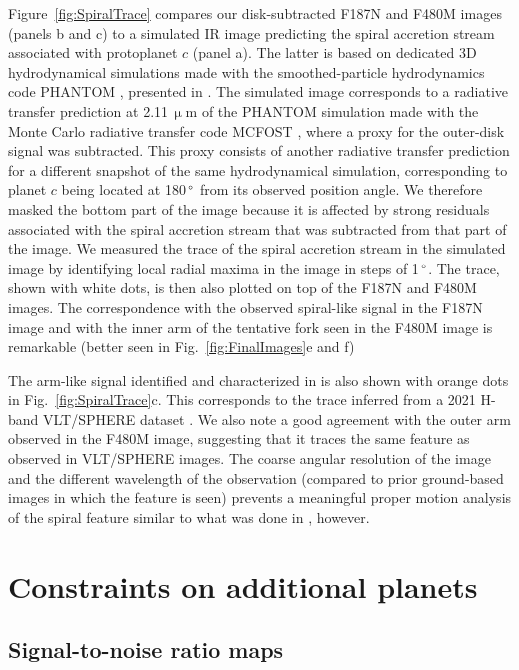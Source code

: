 \documentclass[longauth]{aa}
\begin{document}
\begin{appendix}
Figure~\ref{fig:SpiralTrace} compares our disk-subtracted F187N and F480M images (panels b and c) to a simulated IR image predicting the spiral accretion stream associated with protoplanet $c$ (panel a). The latter is based on dedicated 3D hydrodynamical simulations made with the smoothed-particle hydrodynamics code PHANTOM \citep{Price2018}, presented in \citet{Toci2020}. The simulated image corresponds to a %
radiative transfer prediction at 2.11\,$\upmu$m of the PHANTOM simulation made with the Monte Carlo radiative transfer code MCFOST \citep{Pinte2006}, 
where a proxy for the outer-disk signal was subtracted. This proxy consists of another radiative transfer prediction for a different snapshot of the same hydrodynamical simulation, corresponding to planet $c$ being located at 180\,$^\circ$ from its observed position angle. We therefore masked the bottom part of the image because it is affected by strong residuals associated with the spiral accretion stream that was subtracted from that part of the image. We measured the trace of the spiral accretion stream in the simulated image by identifying local radial maxima in the image in steps of 1\,$^\circ$. The trace, shown with white dots, is then also plotted on top of the F187N and F480M images. The correspondence with the observed spiral-like signal in the F187N image and with the inner arm of the tentative fork seen in the F480M image is remarkable (better seen in Fig.~\ref{fig:FinalImages}e and f)

The arm-like signal identified and characterized in \citet{Juillard2022} is also shown with orange dots in Fig.~\ref{fig:SpiralTrace}c. This corresponds to the trace inferred from a 2021 H-band VLT/SPHERE dataset
\citep[ESO Program 60.A-9801; see more details in][]{Juillard2022}. We also note a good agreement with the outer arm %
observed in the F480M image, suggesting that it traces the same feature as observed in VLT/SPHERE images. The coarse angular resolution of the image and the different wavelength of the observation (compared to prior ground-based images in which the feature is seen) prevents a meaningful proper motion analysis of the spiral feature similar to what was done in \citet{Juillard2022}, however.

\section{Constraints on additional planets}\label{sec:contrast_curves}

\subsection{Signal-to-noise ratio maps}


\end{appendix}
\end{document}
